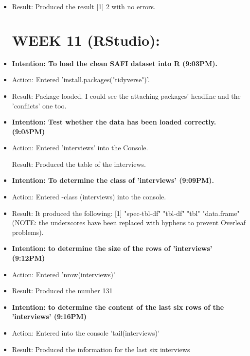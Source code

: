 \documentclass[a4paper,12pt]{article}
\begin{document}
\begin{itemize}
\item Result: Produced the result [1] 2 with no errors. 


\section{WEEK 11 (RStudio):}

\item \textbf{Intention: To load the clean SAFI dataset into R (9:03PM).}


\item Action: Entered 'install.packages("tidyverse")'. 


\item Result: Package loaded. I could see the attaching packages' headline and the 'conflicts' one too.


\item \textbf{Intention: Test whether the data has been loaded correctly. (9:05PM)}


\item Action: Entered 'interviews' into the Console.


\result Result: Produced the table of the interviews.


\item \textbf{Intention: To determine the class of 'interviews' (9:09PM).}


\item Action: Entered -class (interviews) into the console. 

\item Result: It produced the following: [1] "spec-tbl-df" "tbl-df"      "tbl"         "data.frame" (NOTE: the underscores have been replaced with hyphens to prevent Overleaf problems).


\item \textbf{Intention: to determine the size of the rows of 'interviews' (9:12PM)}


\item Action: Entered 'nrow(interviews)'


\item Result: Produced the number 131


\item \textbf{Intention: to determine the content of the last six rows of the 'interviews' (9:16PM)}


\item Action: Entered into the console 'tail(interviews)'


\item Result: Produced the information for the last six interviews 



\end{itemize}
\end{document}
